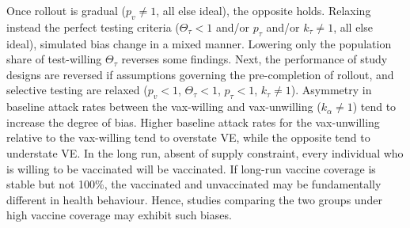 \documentclass[12pt]{article}
\begin{document}
Once rollout is gradual ($p_v \neq 1$, all else ideal), the opposite holds. Relaxing instead the perfect testing criteria ($\Theta_{\tau} < 1$ and/or $p_{\tau}$ and/or $k_{\tau} \neq 1$, all else ideal), simulated bias change in a mixed manner. Lowering only the population share of test-willing $\Theta_{\tau}$ reverses some findings. Next, the performance of study designs are reversed if assumptions governing the pre-completion of rollout, and selective testing are relaxed ($p_v<1$, $\Theta_{\tau}<1$, $p_{\tau}<1$, $k_{\tau} \neq 1$). Asymmetry in baseline attack rates between the vax-willing and vax-unwilling ($k_\alpha \neq 1$) tend to increase the degree of bias. Higher baseline attack rates for the vax-unwilling relative to the vax-willing tend to overstate VE, while the opposite tend to understate VE. In the long run, absent of supply constraint, every individual who is willing to be vaccinated will be vaccinated. If long-run vaccine coverage is stable but not 100\%, the vaccinated and unvaccinated may be fundamentally different in health behaviour. Hence, studies comparing the two groups under high vaccine coverage may exhibit such biases.
\end{document}
